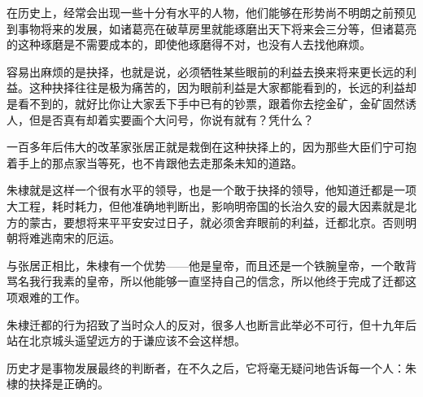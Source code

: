 \begin{multicols}{\theparacolNo}
在历史上，经常会出现一些十分有水平的人物，他们能够在形势尚不明朗之前预见到事物将来的发展，如诸葛亮在破草房里就能琢磨出天下将来会三分等，但诸葛亮的这种琢磨是不需要成本的，即使他琢磨得不对，也没有人去找他麻烦。

容易出麻烦的是抉择，也就是说，必须牺牲某些眼前的利益去换来将来更长远的利益。这种抉择往往是极为痛苦的，因为眼前利益是大家都能看到的，长远的利益却是看不到的，就好比你让大家丢下手中已有的钞票，跟着你去挖金矿，金矿固然诱人，但是否真有却着实要画个大问号，你说有就有？凭什么？

一百多年后伟大的改革家张居正就是栽倒在这种抉择上的，因为那些大臣们宁可抱着手上的那点家当等死，也不肯跟他去走那条未知的道路。

朱棣就是这样一个很有水平的领导，也是一个敢于抉择的领导，他知道迁都是一项大工程，耗时耗力，但他准确地判断出，影响明帝国的长治久安的最大因素就是北方的蒙古，要想将来平平安安过日子，就必须舍弃眼前的利益，迁都北京。否则明朝将难逃南宋的厄运。

与张居正相比，朱棣有一个优势——他是皇帝，而且还是一个铁腕皇帝，一个敢背骂名我行我素的皇帝，所以他能够一直坚持自己的信念，所以他终于完成了迁都这项艰难的工作。

朱棣迁都的行为招致了当时众人的反对，很多人也断言此举必不可行，但十九年后站在北京城头遥望远方的于谦应该不会这样想。

历史才是事物发展最终的判断者，在不久之后，它将毫无疑问地告诉每一个人：朱棣的抉择是正确的。
\ifnum{}
	\end{multicols}
\fi
\newpage
